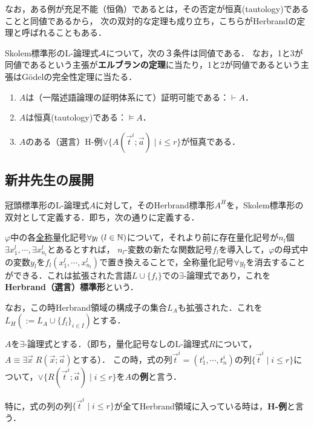 \documentclass[uplatex, dvipdfmx]{jsreport}
\begin{document}
なお，ある例が充足不能（恒偽）であるとは，その否定が恒真(tautology)であることと同値であるから，
次の双対的な定理も成り立ち，こちらがHerbrandの定理と呼ばれることもある．

\begin{theorem}
    Skolem標準形のL-論理式$\mathcal{A}$について，次の３条件は同値である．
    なお，1と3が同値であるという主張が\textbf{エルブランの定理}に当たり，1と2が同値であるという主張はGödelの完全性定理に当たる．
    \begin{enumerate}
        \item $A$は（一階述語論理の証明体系にて）証明可能である：$\vdash A$．
        \item $A$は恒真(tautology)である：$\vDash A$．
        \item $A$のある（選言）H-例$\lor\{A(\vec{t}^i;\vec{a})\mid i\le r\}$が恒真である．
    \end{enumerate}
\end{theorem}

\subsection{新井先生の展開}

\begin{definition}
    冠頭標準形のL-論理式$A$に対して，そのHerbrand標準形$A^H$を，Skolem標準形の双対として定義する．即ち，次の通りに定義する．
    
    $\varphi$中の各\underline{全称}量化記号$\forall y_l\;(l\in\mathbb{N})$について，それより前に存在量化記号が$n_l$個$\exists x_1^l,\cdots,\exists x_{n_l}^l$とあるとすれば，
    $n_l$-変数の新たな関数記号$f_l$を導入して，$\varphi$の母式中の変数$y_l$を$f_l(x^l_1,\cdots,x^l_{n_l})$で置き換えることで，全称量化記号$\forall y_l$を消去することができる．これは拡張された言語$L\cup\{f_i\}$での$\exists$-論理式であり，これを\textbf{Herbrand（選言）標準形}という．

    なお，この時Herbrand領域の構成子の集合$L_A$も拡張された．これを$L_H(:=L_A\cup\{f_l\}_{i\in I})$とする．
\end{definition}

\begin{definition}
    $A$を$\exists$-論理式とする．（即ち，量化記号なしのL-論理式$R$について，$A\equiv\exists\vec{x}\;R(\vec{x};\vec{a})$とする）．
    この時，式の列$\vec{t}^i=(t^i_1,\cdots,t^i_n)$の列$\{\vec{t}^i\mid i\le r\}$について，$\lor\{R(\vec{t}^i;\vec{a})\mid i\le r\}$を$A$の\textbf{例}と言う．

    特に，式の列の列$\{\vec{t}^i\mid i\le r\}$が全てHerbrand領域に入っている時は，\textbf{H-例}と言う．
\end{definition}
\end{document}

